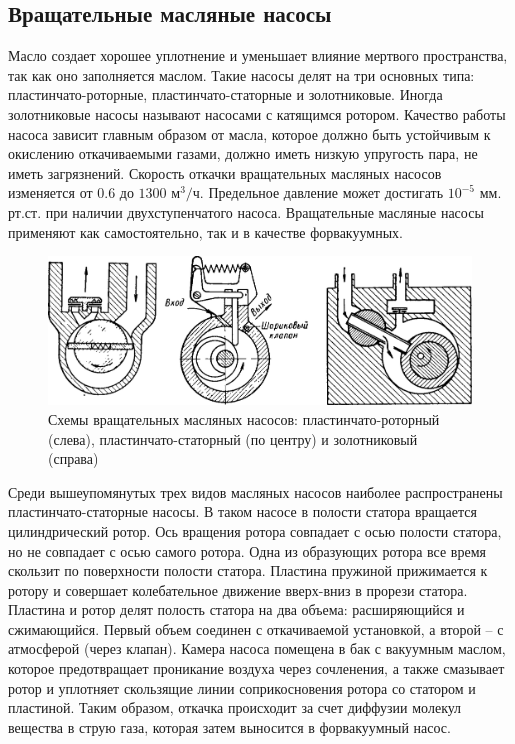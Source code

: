 \documentclass[12pt]{article}
\begin{document}
\subsection*{Вращательные масляные насосы}

Масло создает хорошее уплотнение и уменьшает влияние мертвого пространства, так как оно заполняется маслом. Такие насосы делят на три основных типа: пластинчато-роторные, пластинчато-статорные и золотниковые. Иногда золотниковые насосы называют насосами с катящимся ротором. Качество работы насоса зависит главным образом от масла, которое должно быть устойчивым к окислению откачиваемыми газами, должно иметь низкую упругость пара, не иметь загрязнений. Скорость откачки вращательных масляных насосов изменяется от $0.6$ до $1300$ м$^3/$ч. Предельное давление может достигать $10^{-5}$ мм. рт.ст. при наличии двухступенчатого насоса. Вращательные масляные насосы применяют как самостоятельно, так и в качестве форвакуумных.  

\begin{figure}
	\centering
	\includegraphics[width=0.85\linewidth]{pictures/rotor.png}
	\caption{Схемы вращательных масляных насосов: пластинчато-роторный (слева), пластинчато-статорный (по центру) и золотниковый (справа)}
\end{figure}

Среди вышеупомянутых трех видов масляных насосов наиболее распространены пластинчато-статорные насосы. В таком насосе в полости статора вращается цилиндрический ротор. Ось вращения ротора совпадает с осью полости статора, но не совпадает с осью самого ротора. Одна из образующих ротора все время скользит по поверхности полости статора. Пластина пружиной прижимается к ротору и совершает колебательное движение вверх-вниз в прорези статора. Пластина и ротор делят полость статора на два объема: расширяющийся и сжимающийся. Первый объем соединен с откачиваемой установкой, а второй -- с атмосферой (через клапан). Камера насоса помещена в бак с вакуумным маслом, которое предотвращает проникание воздуха через сочленения, а также смазывает ротор и уплотняет скользящие линии соприкосновения ротора со статором и пластиной. Таким образом, откачка происходит за счет диффузии молекул вещества в струю газа, которая затем выносится в форвакуумный насос.
\end{document}
